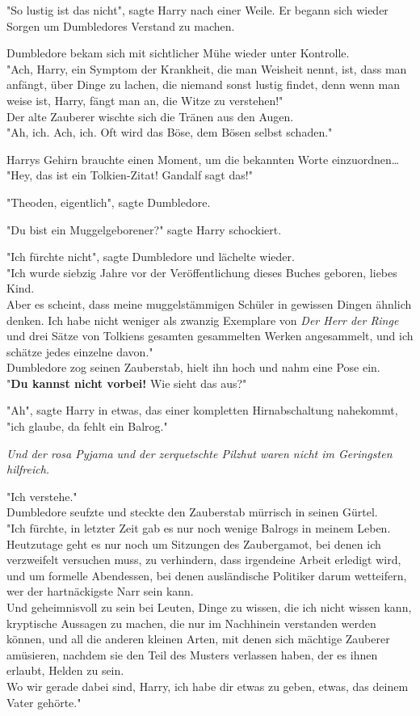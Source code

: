 {"So lustig ist das nicht", sagte Harry nach einer Weile. Er begann sich wieder Sorgen um Dumbledores Verstand zu machen.

Dumbledore bekam sich mit sichtlicher Mühe wieder unter Kontrolle.\\ "Ach, Harry, ein Symptom der Krankheit, die man Weisheit nennt, ist, dass man anfängt, über Dinge zu lachen, die niemand sonst lustig findet, denn wenn man weise ist, Harry, fängt man an, die Witze zu verstehen!"\\ Der alte Zauberer wischte sich die Tränen aus den Augen.\\ "Ah, ich. Ach, ich. Oft wird das Böse, dem Bösen selbst schaden."

Harrys Gehirn brauchte einen Moment, um die bekannten Worte einzuordnen…\\ "Hey, das ist ein Tolkien-Zitat! Gandalf sagt das!"

"Theoden, eigentlich", sagte Dumbledore.

"Du bist ein Muggelgeborener?" sagte Harry schockiert.

"Ich fürchte nicht", sagte Dumbledore und lächelte wieder.\\ "Ich wurde siebzig Jahre vor der Veröffentlichung dieses Buches geboren, liebes Kind.\\ Aber es scheint, dass meine muggelstämmigen Schüler in gewissen Dingen ähnlich denken. Ich habe nicht weniger als zwanzig Exemplare von \emph{Der Herr der Ringe} und drei Sätze von Tolkiens gesamten gesammelten Werken angesammelt, und ich schätze jedes einzelne davon."\\ Dumbledore zog seinen Zauberstab, hielt ihn hoch und nahm eine Pose ein.\\ "\textbf{Du kannst nicht vorbei!} Wie sieht das aus?"

"Ah", sagte Harry in etwas, das einer kompletten Hirnabschaltung nahekommt, "ich glaube, da fehlt ein Balrog."

\emph{Und der rosa Pyjama und der zerquetschte Pilzhut waren nicht im Geringsten hilfreich.}

"Ich verstehe."\\ Dumbledore seufzte und steckte den Zauberstab mürrisch in seinen Gürtel.\\ "Ich fürchte, in letzter Zeit gab es nur noch wenige Balrogs in meinem Leben.\\ Heutzutage geht es nur noch um Sitzungen des Zaubergamot, bei denen ich verzweifelt versuchen muss, zu verhindern, dass irgendeine Arbeit erledigt wird, und um formelle Abendessen, bei denen ausländische Politiker darum wetteifern, wer der hartnäckigste Narr sein kann.\\ Und geheimnisvoll zu sein bei Leuten, Dinge zu wissen, die ich nicht wissen kann, kryptische Aussagen zu machen, die nur im Nachhinein verstanden werden können, und all die anderen kleinen Arten, mit denen sich mächtige Zauberer amüsieren, nachdem sie den Teil des Musters verlassen haben, der es ihnen erlaubt, Helden zu sein.\\ Wo wir gerade dabei sind, Harry, ich habe dir etwas zu geben, etwas, das deinem Vater gehörte."

}
